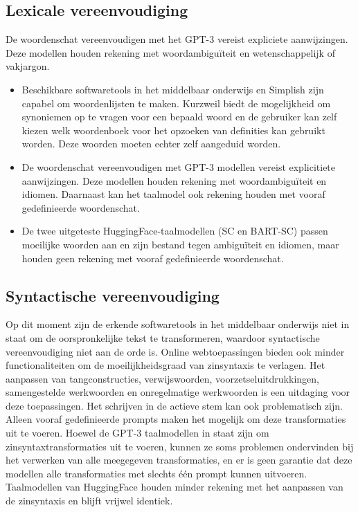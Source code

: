 \subsection{Lexicale vereenvoudiging}

De woordenschat vereenvoudigen met het GPT-3 vereist expliciete aanwijzingen. Deze modellen houden rekening met woordambiguïteit en wetenschappelijk of vakjargon. 

\begin{itemize}
	\item Beschikbare softwaretools in het middelbaar onderwijs en Simplish zijn capabel om woordenlijsten te maken. Kurzweil biedt de mogelijkheid om synoniemen op te vragen voor een bepaald woord en de gebruiker kan zelf kiezen welk woordenboek voor het opzoeken van definities kan gebruikt worden. Deze woorden moeten echter zelf aangeduid worden.
	\item De woordenschat vereenvoudigen met GPT-3 modellen vereist explicitiete aanwijzingen. Deze modellen houden rekening met woordambiguïteit en idiomen. Daarnaast kan het taalmodel ook rekening houden met vooraf gedefinieerde woordenschat. 
	\item De twee uitgeteste HuggingFace-taalmodellen (SC en BART-SC) passen moeilijke woorden aan en zijn bestand tegen ambiguïteit en idiomen, maar houden geen rekening met vooraf gedefinieerde woordenschat.
\end{itemize}

\subsection{Syntactische vereenvoudiging}

Op dit moment zijn de erkende softwaretools in het middelbaar onderwijs niet in staat om de oorspronkelijke tekst te transformeren, waardoor syntactische vereenvoudiging niet aan de orde is. Online webtoepassingen bieden ook minder functionaliteiten om de moeilijkheidsgraad van zinsyntaxis te verlagen. Het aanpassen van tangconstructies, verwijswoorden, voorzetseluitdrukkingen, samengestelde werkwoorden en onregelmatige werkwoorden is een uitdaging voor deze toepassingen. Het schrijven in de actieve stem kan ook problematisch zijn. Alleen vooraf gedefinieerde prompts maken het mogelijk om deze transformaties uit te voeren. Hoewel de GPT-3 taalmodellen in staat zijn om zinsyntaxtransformaties uit te voeren, kunnen ze soms problemen ondervinden bij het verwerken van alle meegegeven transformaties, en er is geen garantie dat deze modellen alle transformaties met slechts één prompt kunnen uitvoeren. Taalmodellen van HuggingFace houden minder rekening met het aanpassen van de zinsyntaxis en blijft vrijwel identiek.


